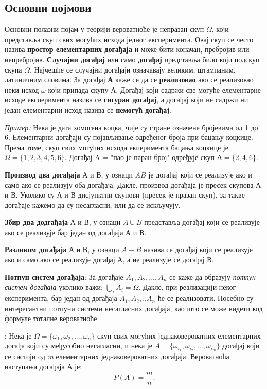 \subsection{Основни појмови}

Основни полазни појам у теорији вероватноће је непразан скуп $\Omega$, који представља скуп свих могућих исхода једног експеримента. Овај скуп се често назива \textbf{простор елементарних догађаја} и може бити коначан, пребројив или непребројив. 
\textbf{Случајни догађај} или само \textbf{догађај} представља било који подскуп скупа $\Omega$. Најчешће се случајни догађаји означавају великим, штампаним, латиничним словима. За догађај \textbf{А} каже се да се \textbf{реализовао} ако се реализовао неки исход $\omega$ који припада скупу А. Догађај који садржи све могуће елементарне исходе експеримента назива се \textbf{сигуран догађај}, а догађај који не садржи ни један елементарни исход назива се \textbf{немогућ догађај}.


\textit{Пример:}
Нека је дата хомогена коцка, чије су стране означене бројевима од 1 до 6. Елементарни догађаји су појављивање одређеног броја при бацању коцкице. Према томе, скуп свих могућих исхода екперимента бацања коцкице је $ \Omega = \lbrace 1,2,3,4,5,6 \rbrace $. Догађај A = "пао је паран број" одређује скуп $ $А$ = \lbrace 2,4,6 \rbrace $.


\textbf{Производ два догађаја} $ А $ и $ В $, у ознаци $ AB $ је догађај који се реализује ако и само ако се реализују оба догађаја. Дакле, производ догађаја је пресек скупова А и В. Уколико су А и В дисјунктни скупови (пресек је празан скуп), за такве догађаје кажемо да су несагласни, или да се искључују.

\textbf{Збир два додгађаја} А и В, у ознаци $ A \cup B $ представља догађај који се реализује ако се реализује бар један од догађаја А и В. 

\textbf{Разликом догађаја} А и В, у ознаци $ A -  B $ назива се догађај који се реализује ако и само ако се реализује догађај А, а не реализује се догађај В. 

\textbf{Потпун систем догађаја}: За догађаје $ A_1, A_2,...,A_n$ се каже да образују \textit{потпун систем догађаја} уколико важи: $ \bigcup_{i} A_i = \Omega $. Дакле, при реализацији неког експеримента, бар један од догађаја $ A_1,A_2,..A_n$ ће се реализовати. Посебно су интересантни потпуни системи несагласних догађаја, као што се може видети код формуле тоталне вероватноће.

\begin{de}
 : Нека је $ \Omega = \lbrace \omega_1,\omega_2,...,\omega_n \rbrace $ скуп свих могућих једнаковероватних елементарних догађа који су међусобно несагласни, и нека је $ A = \lbrace \omega_{i_1}, \omega_{i_2}, ... , \omega_{i_m} \rbrace $ догађај који се састоји од \textit{m} елементарних једнаковероватних догађаја. Вероватноћа наступања догађаја А је:
\begin{equation}
 P(A) = \frac{m}{n} .
\end{equation}
\end{de}

